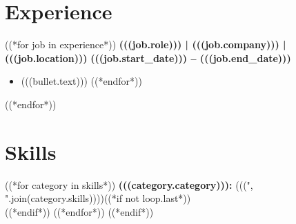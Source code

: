 \documentclass[10pt, a4paper]{article}
\newenvironment{highlights}{
    \begin{itemize}[
        topsep=2pt,
        parsep=0pt,
        partopsep=0pt,
        itemsep=2pt,
        leftmargin=0.45cm
    ]
}{
    \end{itemize}
}
\begin{document}
    \section{Experience}
        ((*for job in experience*))
        \textbf{(((job.role))) | (((job.company))) | (((job.location)))} \hfill \textbf{(((job.start_date))) -- (((job.end_date)))}
        \begin{highlights}
            ((*for bullet in job.bullets*))
                \item (((bullet.text)))
            ((*endfor*))
        \end{highlights}
        ((*endfor*))
    \vspace{0.1cm}

    \section{Skills}
        ((*for category in skills*))
        \textbf{(((category.category))):} (((", ".join(category.skills))))((*if not loop.last*)) \\((*endif*))
        ((*endfor*))
    \vspace{0.1cm}
    ((*endif*))
\end{document}

